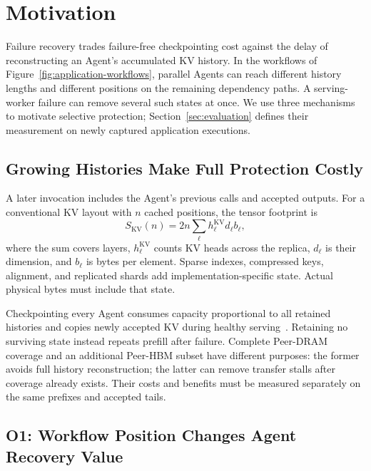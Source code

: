 \section{Motivation}\label{sec:motivation}

Failure recovery trades failure-free checkpointing cost against the delay of reconstructing an Agent's accumulated KV history. In the workflows of Figure~\ref{fig:application-workflows}, parallel Agents can reach different history lengths and different positions on the remaining dependency paths. A serving-worker failure can remove several such states at once. We use three mechanisms to motivate selective protection; Section~\ref{sec:evaluation} defines their measurement on newly captured application executions.

\subsection{Growing Histories Make Full Protection Costly}\label{sec:motivation:cost}

A later invocation includes the Agent's previous calls and accepted outputs. For a conventional KV layout with $n$ cached positions, the tensor footprint is
\begin{equation}
S_{\mathrm{KV}}(n)=2n\sum_{\ell}h^{\mathrm{KV}}_{\ell}d_{\ell}b_{\ell},
\end{equation}
where the sum covers layers, $h^{\mathrm{KV}}_{\ell}$ counts KV heads across the replica, $d_{\ell}$ is their dimension, and $b_{\ell}$ is bytes per element. Sparse indexes, compressed keys, alignment, and replicated shards add implementation-specific state. Actual physical bytes must include that state.

Checkpointing every Agent consumes capacity proportional to all retained histories and copies newly accepted KV during healthy serving~\cite{strati2024dejavu,jayakody2026ghostserve}. Retaining no surviving state instead repeats prefill after failure. Complete Peer-DRAM coverage and an additional Peer-HBM subset have different purposes: the former avoids full history reconstruction; the latter can remove transfer stalls after coverage already exists. Their costs and benefits must be measured separately on the same prefixes and accepted tails.

\subsection{O1: Workflow Position Changes Agent Recovery Value}\label{sec:motivation:agent}


